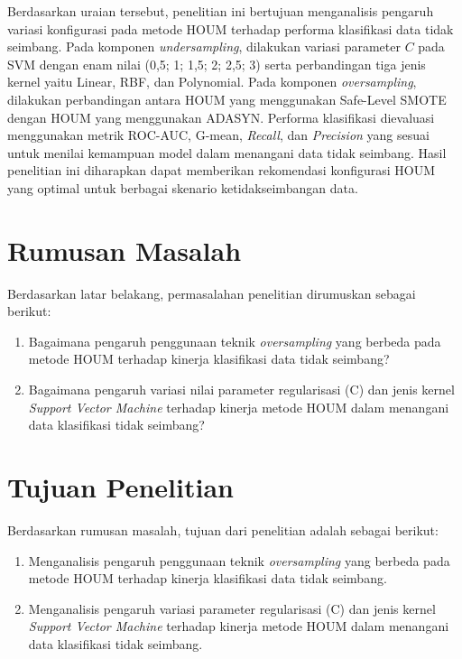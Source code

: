 Berdasarkan uraian tersebut, penelitian ini bertujuan menganalisis pengaruh variasi konfigurasi pada metode HOUM terhadap performa klasifikasi data tidak seimbang. Pada komponen \textit{undersampling}, dilakukan variasi parameter $C$ pada SVM dengan enam nilai (0,5; 1; 1,5; 2; 2,5; 3) serta perbandingan tiga jenis kernel yaitu Linear, RBF, dan Polynomial. Pada komponen \textit{oversampling}, dilakukan perbandingan antara HOUM yang menggunakan Safe-Level SMOTE dengan HOUM yang menggunakan ADASYN. Performa klasifikasi dievaluasi menggunakan metrik ROC-AUC, G-mean, \textit{Recall}, dan \textit{Precision} yang sesuai untuk menilai kemampuan model dalam menangani data tidak seimbang. Hasil penelitian ini diharapkan dapat memberikan rekomendasi konfigurasi HOUM yang optimal untuk berbagai skenario ketidakseimbangan data.


\section{Rumusan Masalah} \label{I.Rumusan Masalah}

Berdasarkan latar belakang, permasalahan penelitian dirumuskan sebagai berikut: \par

\begin{enumerate}[noitemsep]
	\item Bagaimana pengaruh penggunaan teknik \textit{oversampling} yang berbeda pada metode HOUM terhadap kinerja klasifikasi data tidak seimbang?
	\item Bagaimana pengaruh variasi nilai parameter regularisasi (C) dan jenis kernel \textit{Support Vector Machine} terhadap kinerja metode HOUM dalam menangani data klasifikasi tidak seimbang?
\end{enumerate}


\section{Tujuan Penelitian} \label{I.Tujuan}
Berdasarkan rumusan masalah, tujuan dari penelitian adalah sebagai berikut: \par

\begin{enumerate}[noitemsep]
	\item Menganalisis pengaruh penggunaan teknik \textit{oversampling} yang berbeda pada metode HOUM terhadap kinerja klasifikasi data tidak seimbang. 
	\item Menganalisis pengaruh variasi parameter regularisasi (C) dan jenis kernel \textit{Support Vector Machine} terhadap kinerja metode HOUM dalam menangani data klasifikasi tidak seimbang.
\end{enumerate}


